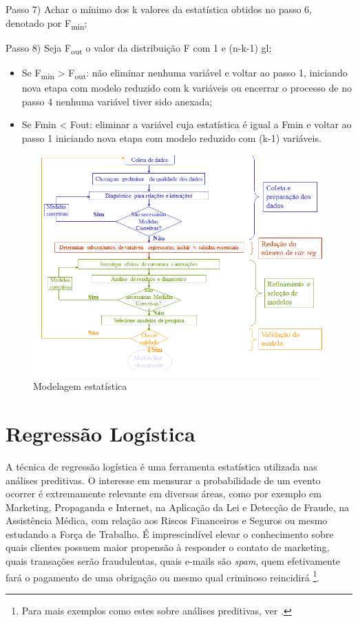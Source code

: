 \documentclass[12pt,brazil,]{book}
\let\rmarkdownfootnote\footnote%
\def\footnote{\protect\rmarkdownfootnote}
\begin{document}
Passo 7) Achar o mínimo dos k valores da estatística obtidos no passo 6,
denotado por F\textsubscript{min};

Passo 8) Seja F\textsubscript{out} o valor da distribuição F com 1 e
(n-k-1) gl;

\begin{itemize}
\item
  Se F\textsubscript{min} \textgreater{} F\textsubscript{out}: não
  eliminar nenhuma variável e voltar ao passo 1, iniciando nova etapa
  com modelo reduzido com k variáveis ou encerrar o processo de no passo
  4 nenhuma variável tiver sido anexada;
\item
  Se Fmin \textless{} Fout: eliminar a variável cuja estatística é igual
  a Fmin e voltar ao passo 1 iniciando nova etapa com modelo reduzido
  com (k-1) variáveis.
\end{itemize}

\begin{figure}
\centering
\includegraphics{regress1.png}
\caption{Modelagem estatística}
\end{figure}

\printbibliography[segment=\therefsegment,heading=subbibliography]

\hypertarget{regressao-logistica}{%
\chapter{Regressão Logística}\label{regressao-logistica}}

A técnica de regressão logística é uma ferramenta estatística utilizada
nas análises preditivas. O interesse em mensurar a probabilidade de um
evento ocorrer é extremamente relevante em diversas áreas, como por
exemplo em Marketing, Propaganda e Internet, na Aplicação da Lei e
Detecção de Fraude, na Assistência Médica, com relação aos Riscos
Financeiros e Seguros ou mesmo estudando a Força de Trabalho. É
imprescindível elevar o conhecimento sobre quais clientes possuem maior
propensão à responder o contato de marketing, quais transações serão
fraudulentas, quais e-mails são \emph{spam}, quem efetivamente fará o
pagamento de uma obrigação ou mesmo qual criminoso reincidirá \footnote{Para
  mais exemplos como estes sobre análises preditivas, ver
  \textcite{Siegel2017}.}.
\end{document}
